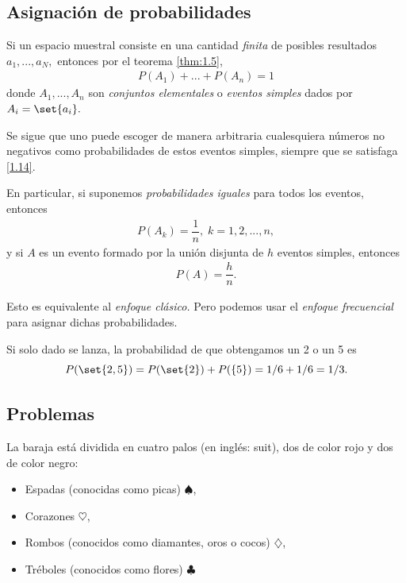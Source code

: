 \subsection{Asignación de probabilidades}
 {}
 Si un espacio muestral consiste en una cantidad \emph{finita} de posibles resultados $a_{1},...,a_{N},$ entonces por el teorema \ref{thm:1.5},
 \begin{align}
  \label{eq:0.1.14}
  P(A_{1})+...+P(A_{n})=1
 \end{align}
 donde $A_{1},...,A_{n}$ son \emph{conjuntos elementales} o \emph{eventos simples} dados por $A_{i}=\set{a_{i}}.$


{}
Se sigue que uno puede escoger de manera arbitraria cualesquiera números no negativos como probabilidades de estos eventos simples, siempre que se satisfaga \eqref{1.14}. 

En particular, si suponemos \emph{probabilidades iguales} para todos los eventos, entonces
\begin{align}
 \label{eq:0.1.15}
 P(A_{k})=\dfrac{1}{n}, \; k=1,2,...,n,
\end{align}
y si $A$ es un evento formado por la unión disjunta de $h$ eventos simples, entonces
\begin{align}
	\label{eq:0.1.16}
 P(A)=\dfrac{h}{n}.
\end{align}


{}
\begin{rem}
 Esto es equivalente al \textit{enfoque clásico.} Pero podemos usar el \textit{enfoque frecuencial} para asignar dichas probabilidades.
\end{rem}


{}
\begin{ejemplo}
 \label{exmp:0.1.12}
 Si solo dado se lanza, la probabilidad de que obtengamos un 2 o un 5 es 
 \[ P(\set{2,5}) = P(\set{2}) + P(\{5\}) = 1/6 + 1/6 = 1/3. \]
\end{ejemplo}



 \subsection{Problemas}
 
 La baraja está dividida en cuatro palos (en inglés: suit), dos de color rojo y dos de color negro:
 \begin{itemize}
  \item Espadas (conocidas como picas) $\spadesuit$,
  \item Corazones $\heartsuit$,
  \item Rombos (conocidos como diamantes, oros o cocos) $ \diamondsuit$,
  \item Tréboles (conocidos como flores) $\clubsuit$
 \end{itemize}
 
